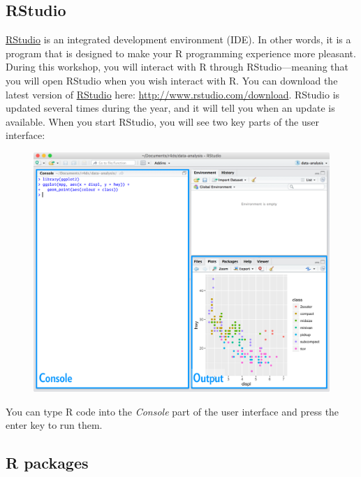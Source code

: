 \documentclass[]{book}
\begin{document}
\subsection{RStudio}\label{rstudio}

\href{https://www.rstudio.com/}{RStudio} is an integrated development
environment (IDE). In other words, it is a program that is designed to
make your R programming experience more pleasant. During this workshop,
you will interact with R through RStudio---meaning that you will open
RStudio when you wish interact with R. You can download the latest
version of \href{https://www.rstudio.com/}{RStudio} here:
\url{http://www.rstudio.com/download}. RStudio is updated several times
during the year, and it will tell you when an update is available. When
you start RStudio, you will see two key parts of the user interface:

\begin{figure}
\centering
\includegraphics{rstudio-console.png}
\caption{}
\end{figure}

You can type R code into the \emph{Console} part of the user interface
and press the enter key to run them.

\subsection{R packages}\label{r-packages}
\end{document}
